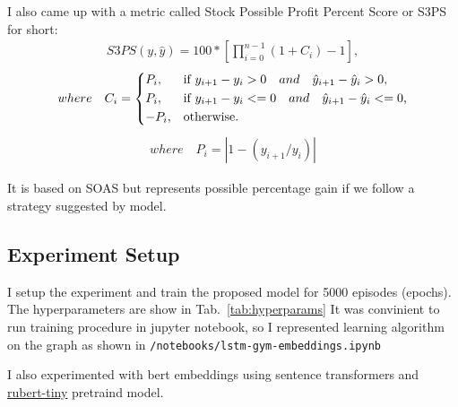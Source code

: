 \documentclass{article}
\begin{document}
I also came up with a metric called Stock Possible Profit Percent Score or S3PS for short:
\begin{align}
S3PS(y, \hat{y}) = 100 * [\prod_{i=0}^{n-1}{(1 + C_i)} - 1],
\end{align}
\begin{align}
where \quad C_i = \begin{dcases*}
        P_i, & if $ y_{i+1} - y_{i} > 0  \quad and \quad \hat{y}_{i+1} - \hat{y}_{i} > 0 $,\\
        P_i, & if $ y_{i+1} - y_{i} <= 0  \quad and \quad \hat{y}_{i+1} - \hat{y}_{i} <= 0 $,\\
        -P_i, & otherwise. 
        \end{dcases*} \nonumber 
\end{align}
\begin{align}
where \quad P_i = \left| 1 - (y_{i+1}/y_{i}) \right| \nonumber 
\end{align}

It is based on SOAS but represents possible percentage gain if we follow a strategy suggested by model.


\subsection{Experiment Setup}
I setup the experiment and train the proposed model for 5000 episodes (epochs).
The hyperparameters are show in Tab.~\ref{tab:hyperparams}
It was convinient to run training procedure in jupyter notebook, so I represented learning algorithm on the graph as shown in \texttt{/notebooks/lstm-gym-embeddings.ipynb}

I also experimented with bert embeddings using sentence transformers and \href{https://huggingface.co/cointegrated/rubert-tiny}{rubert-tiny} pretraind model.
\end{document}

